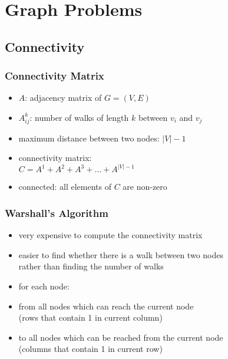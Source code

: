 \documentclass[dvipsnames]{beamer}
\begin{document}
\section{Graph Problems}

\subsection{Connectivity}

\begin{frame}
  \frametitle{Connectivity Matrix}

  \begin{itemize}
    \item $A$: adjacency matrix of $G=(V,E)$
    \item $A^k_{ij}$: number of walks of length $k$ between $v_i$ and $v_j$

    \medskip
    \item maximum distance between two nodes: $|V|-1$

    \pause
    \medskip
    \item connectivity matrix:\\
      $C = A^1 + A^2 + A^3 + \dots + A^{|V|-1}$
    \item connected: all elements of $C$ are non-zero
  \end{itemize}
\end{frame}

\begin{frame}
  \frametitle{Warshall's Algorithm}

  \begin{itemize}
    \item very expensive to compute the connectivity matrix
    \item easier to find whether there is a walk between two nodes\\
      rather than finding the number of walks

    \pause
    \bigskip
    \item for each node:
    \smallskip
    \item from all nodes which can reach the current node\\
      (rows that contain 1 in current column)

    \item to all nodes which can be reached from the current node\\
      (columns that contain 1 in current row)
  \end{itemize}
\end{frame}
\end{document}
